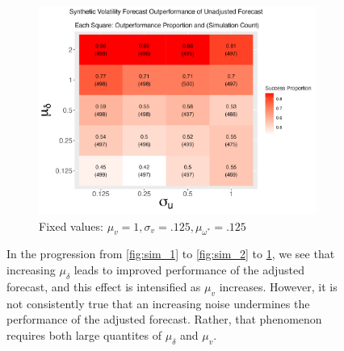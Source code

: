 \documentclass[11pt,3p,review,authoryear]{elsarticle}
\theoremstyle{definition}
\begin{document}
\begin{figure}[!h]
    \begin{subfigure}{.44\linewidth} 
      \centering
        \includegraphics[scale=.42]{simulation_plots/Jul01_192518_2024_mu[delta]_sigma[u].png}
        \caption{Fixed values: $\mu_{v} = 1, \sigma_{v} = .125, \mu_{\omega^{*}} = .125$}\label{fig:sim_3}
    \end{subfigure}
    
        \caption{In the progression from \ref{fig:sim_1} to \ref{fig:sim_2} to \ref{fig:sim_3}, we see that increasing $\mu_{\delta}$ leads to improved performance of the adjusted forecast, and this effect is intensified as $\mu_{v}$ increases.  However, it is not consistently true that an increasing noise undermines the performance of the adjusted forecast.  Rather, that phenomenon requires both large quantites of $\mu_{\delta}$ and $\mu_{v}$.}
        \label{fig:signoise}
      \end{figure}
\end{document}
